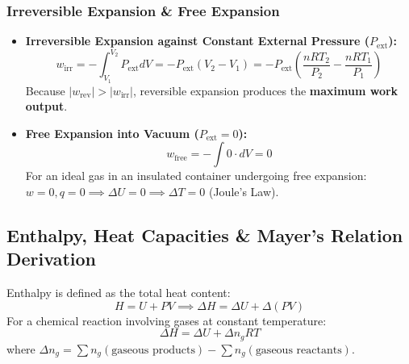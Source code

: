 \documentclass[10pt,twoside,openright]{book}
\begin{document}
\subsubsection{Irreversible Expansion \& Free Expansion}
\begin{itemize}
  \item \textbf{Irreversible Expansion against Constant External Pressure ($P_{\text{ext}}$):}
  \begin{equation}
    w_{\text{irr}} = -\int_{V_1}^{V_2} P_{\text{ext}} dV = -P_{\text{ext}}(V_2 - V_1) = -P_{\text{ext}}\left(\frac{n R T_2}{P_2} - \frac{n R T_1}{P_1}\right)
  \end{equation}
  Because $|w_{\text{rev}}| > |w_{\text{irr}}|$, reversible expansion produces the \textbf{maximum work output}.
  \item \textbf{Free Expansion into Vacuum ($P_{\text{ext}} = 0$):}
  \begin{equation}
    w_{\text{free}} = -\int 0 \cdot dV = 0
  \end{equation}
  For an ideal gas in an insulated container undergoing free expansion: $w = 0, q = 0 \implies \Delta U = 0 \implies \Delta T = 0$ (Joule's Law).
\end{itemize}

\subsection{Enthalpy, Heat Capacities \& Mayer's Relation Derivation}
Enthalpy is defined as the total heat content:
\begin{equation}
  H = U + P V \implies \Delta H = \Delta U + \Delta(P V)
\end{equation}
For a chemical reaction involving gases at constant temperature:
\begin{equation}
  \Delta H = \Delta U + \Delta n_g R T
\end{equation}
where $\Delta n_g = \sum n_g(\text{gaseous products}) - \sum n_g(\text{gaseous reactants})$.
\end{document}
